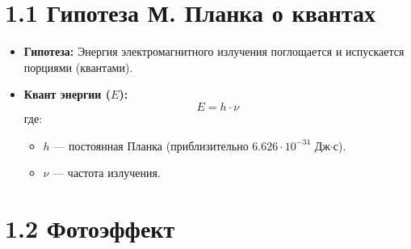 \documentclass[a4paper,12pt]{article}
\begin{document}
\begin{center}
\end{center}

\vspace{-2em}








\vspace{-9pt}
\section*{1.1 Гипотеза М. Планка о квантах}
\vspace{-3pt}
\begin{itemize}[itemsep=0pt, topsep=0pt, parsep=3pt]
    \item \textbf{Гипотеза:} Энергия электромагнитного излучения поглощается и испускается порциями (квантами).
    \item \textbf{Квант энергии ($E$):}
    \vspace{-0.05em}
    $$ E = h \cdot \nu $$
    где:
    \begin{itemize}[itemsep=0pt, topsep=0pt, parsep=3pt]
        \item $h$ — постоянная Планка (приблизительно $6.626 \cdot 10^{-34}$ Дж$\cdot$с).
        \item $\nu$ — частота излучения.
    \end{itemize}
\end{itemize}


\section*{1.2 Фотоэффект}
\vspace{-9pt}
\end{document}
